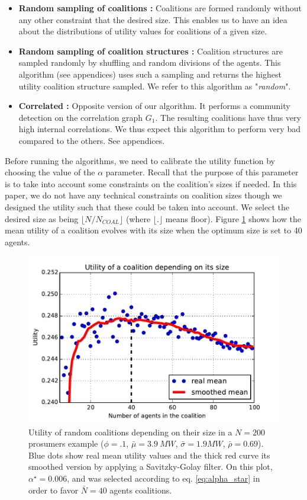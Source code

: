 \documentclass[journal]{IEEEtran}
\begin{document}
\begin{itemize}
\item \textbf{Random sampling of coalitions :} Coalitions are formed randomly without any other constraint that the desired size. This enables us to have an idea about the distributions of utility values for coalitions of a given size.
\item \textbf{Random sampling of coalition structures :} Coalition structures are sampled randomly by shuffling and random divisions of the agents. This algorithm (see appendices) uses such a sampling and returns the highest utility coalition structure sampled. We refer to this algorithm as "\textit{random}".
\item \textbf{Correlated :} Opposite version of our algorithm. It performs a community detection on the correlation graph $ G_{1} $. The resulting coalitions have thus very high internal correlations. We thus expect this algorithm to perform very bad compared to the others. See appendices.
\end{itemize} 


Before running the algorithms, we need to calibrate the utility function by choosing the value of the $ \alpha $ parameter. Recall that the purpose of this parameter is to take into account some constraints on the coalition's sizes if needed. In this paper, we do not have any technical constraints on coalition sizes though we designed the utility such that these could be taken into account. We select the desired size as being $ \lfloor N/N_{COAL} \rfloor $ (where $ \lfloor.\rfloor $ means floor). Figure \ref{fig:real_utility2} shows how the mean utility of a coalition evolves with its size when the optimum size is set to 40 agents.
\begin{figure}
\includegraphics[scale=.48]{./figs/figure_4}
\caption{{\footnotesize Utility of random coalitions depending on their size in a $N=200$ prosumers example ($\phi = .1$, $ \bar{\mu}=3.9\ MW $, $\bar{\sigma} = 1.9 MW $, $ \bar{\rho} = 0.69 $). Blue dots show real mean utility values and the thick red curve its smoothed version by applying a Savitzky-Golay filter. On this plot, $ \alpha^{\star} = 0.006 $, and was selected according to eq. \ref{eq:alpha_star} in order to favor $\bar{N} = 40$ agents coalitions.}}
\label{fig:real_utility2}
\end{figure}
\end{document}
